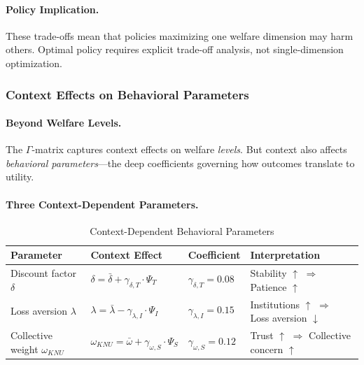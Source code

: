 \paragraph{Policy Implication.}
These trade-offs mean that policies maximizing one welfare dimension may 
harm others. Optimal policy requires explicit trade-off analysis, not 
single-dimension optimization.

\subsubsection{Context Effects on Behavioral Parameters}

\paragraph{Beyond Welfare Levels.}
The $\Gamma$-matrix captures context effects on welfare \emph{levels}.
But context also affects \emph{behavioral parameters}---the deep coefficients 
governing how outcomes translate to utility.

\paragraph{Three Context-Dependent Parameters.}

\begin{table}[htbp]
\centering
\caption{Context-Dependent Behavioral Parameters}
\label{tab:context-parameters}
\renewcommand{\arraystretch}{1.4}
\begin{tabular}{@{}llll@{}}
\toprule
\textbf{Parameter} & \textbf{Context Effect} & \textbf{Coefficient} & \textbf{Interpretation} \\
\midrule
Discount factor $\delta$ & $\delta = \bar{\delta} + \gamma_{\delta,T} \cdot \Psi_T$ & $\gamma_{\delta,T} = 0.08$ & Stability $\uparrow$ $\Rightarrow$ Patience $\uparrow$ \\
Loss aversion $\lambda$ & $\lambda = \bar{\lambda} - \gamma_{\lambda,I} \cdot \Psi_I$ & $\gamma_{\lambda,I} = 0.15$ & Institutions $\uparrow$ $\Rightarrow$ Loss aversion $\downarrow$ \\
Collective weight $\omega_{KNU}$ & $\omega_{KNU} = \bar{\omega} + \gamma_{\omega,S} \cdot \Psi_S$ & $\gamma_{\omega,S} = 0.12$ & Trust $\uparrow$ $\Rightarrow$ Collective concern $\uparrow$ \\
\bottomrule
\end{tabular}
\end{table}

